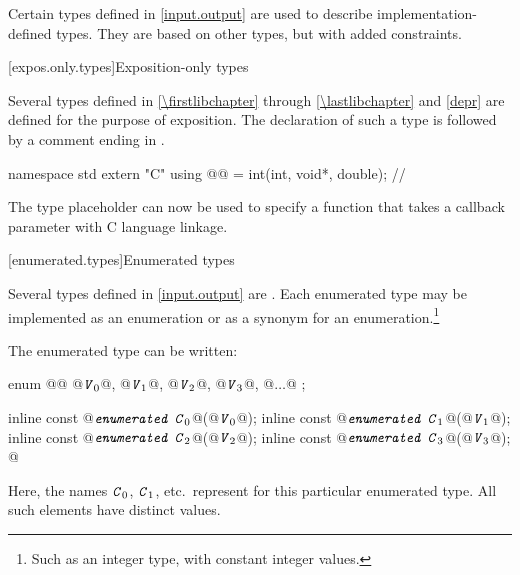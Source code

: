 \pnum
Certain types defined in \ref{input.output} are used to describe implementation-defined types.
%
They are based on other types, but with added constraints.

[expos.only.types]{Exposition-only types}

\pnum
Several types defined in \ref{\firstlibchapter} through \ref{\lastlibchapter}
and \ref{depr} are defined for the purpose of exposition.
The declaration of such a type is followed by a comment ending in \expos.
\begin{example}
\begin{codeblock}
namespace std {
  extern "C" using @@ = int(int, void*, double);  // \expos
}
\end{codeblock}
The type placeholder  can now be used to specify a function
that takes a callback parameter with C language linkage.
\end{example}

[enumerated.types]{Enumerated types}

\pnum
Several types defined in \ref{input.output} are
.
Each enumerated type may be implemented as an enumeration or as a synonym for
an enumeration.\footnote{Such as an integer type, with constant integer
values.}

\pnum
The enumerated type  can be written:

\begin{codeblock}
enum @@ { @$\texttt{\textit{V}}_{0}$@, @$\texttt{\textit{V}}_{1}$@, @$\texttt{\textit{V}}_{2}$@, @$\texttt{\textit{V}}_{3}$@, @$\ldots$@ };

inline const @$\texttt{\textit{enumerated C}}_{0}$@(@$\texttt{\textit{V}}_{0}$@);
inline const @$\texttt{\textit{enumerated C}}_{1}$@(@$\texttt{\textit{V}}_{1}$@);
inline const @$\texttt{\textit{enumerated C}}_{2}$@(@$\texttt{\textit{V}}_{2}$@);
inline const @$\texttt{\textit{enumerated C}}_{3}$@(@$\texttt{\textit{V}}_{3}$@);
  @\vdots@
\end{codeblock}

\pnum
Here, the names $\texttt{\textit{C}}_0$,
$\texttt{\textit{C}}_1$, etc.\ represent
for this particular enumerated type.
%
All such elements have distinct values.

